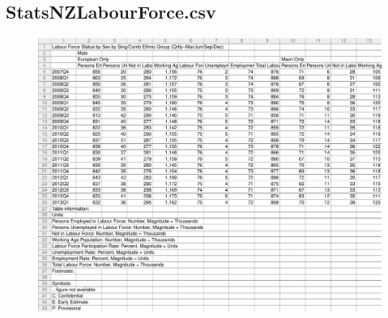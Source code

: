 \documentclass[a4paper]{article}
\begin{document}
\subsection{StatsNZLabourForce.csv}
\label{sec:TCRO_StatsNZLabourForce.csv}
\begin{figure}[!h]
\centering
\includegraphics[width=\textwidth]{./TestCase/StatsNZLabourForce.pdf}
\end{figure}
\end{document}
